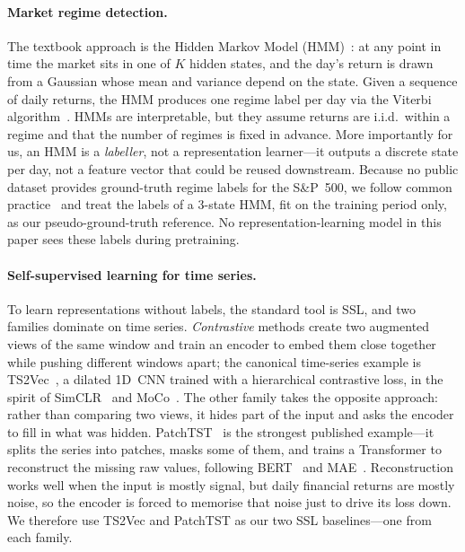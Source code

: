 \documentclass[twocolumn, 10pt]{article}
\begin{document}
\paragraph{Market regime detection.}
The textbook approach is the Hidden Markov Model
(HMM)~\cite{hamilton1989, ang2002, kim1999}: at any point in time the
market sits in one of $K$ hidden states, and the day's return is drawn
from a Gaussian whose mean and variance depend on the state. Given a
sequence of daily returns, the HMM produces one regime label per day via
the Viterbi algorithm~\cite{baum1970}. HMMs are interpretable, but they
assume returns are i.i.d.\ within a regime and that the number of regimes
is fixed in advance. More importantly for us, an HMM is a \emph{labeller},
not a representation learner---it outputs a discrete state per day, not a
feature vector that could be reused downstream. Because no public dataset
provides ground-truth regime labels for the S\&P~500, we follow common
practice~\cite{lopezdeprado2018, dixon2020} and treat the labels of a
3-state HMM, fit on the training period only, as our pseudo-ground-truth
reference. No representation-learning model in this paper sees these
labels during pretraining.

\paragraph{Self-supervised learning for time series.}
To learn representations without labels, the standard tool is SSL, and
two families dominate on time series. \emph{Contrastive} methods create
two augmented views of the same window and train an encoder to embed them
close together while pushing different windows apart; the canonical
time-series example is TS2Vec~\cite{yue2022ts2vec}, a dilated 1D~CNN
trained with a hierarchical contrastive loss, in the spirit of
SimCLR~\cite{chen2020simclr} and MoCo~\cite{he2020moco}. The other family
takes the opposite approach: rather than comparing two views, it hides
part of the input and asks the encoder to fill in what was hidden.
PatchTST~\cite{patchtst} is the strongest published example---it splits
the series into patches, masks some of them, and trains a Transformer to
reconstruct the missing raw values, following BERT~\cite{devlin2018bert}
and MAE~\cite{he2022mae}. Reconstruction works well when the input is
mostly signal, but daily financial returns are mostly noise, so the
encoder is forced to memorise that noise just to drive its loss down. We
therefore use TS2Vec and PatchTST as our two SSL baselines---one from each
family.
\end{document}
